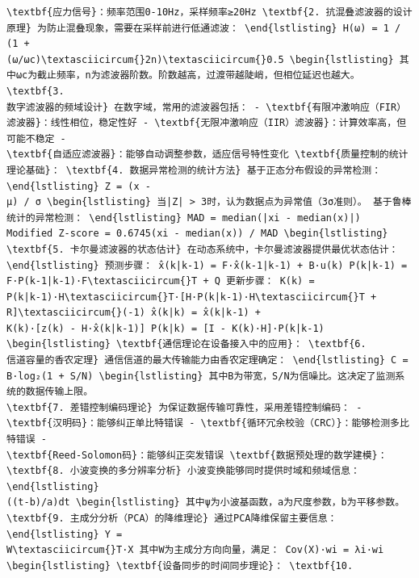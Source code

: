 \begin{verbatim}
\textbf{应力信号}：频率范围0-10Hz，采样频率≥20Hz \textbf{2. 抗混叠滤波器的设计原理} 为防止混叠现象，需要在采样前进行低通滤波： \end{lstlisting} H(ω) = 1 / (1 +
(ω/ωc)\textasciicircum{}2n)\textasciicircum{}0.5 \begin{lstlisting} 其中ωc为截止频率，n为滤波器阶数。阶数越高，过渡带越陡峭，但相位延迟也越大。 \textbf{3.
数字滤波器的频域设计} 在数字域，常用的滤波器包括： - \textbf{有限冲激响应（FIR）滤波器}：线性相位，稳定性好 - \textbf{无限冲激响应（IIR）滤波器}：计算效率高，但可能不稳定 -
\textbf{自适应滤波器}：能够自动调整参数，适应信号特性变化 \textbf{质量控制的统计理论基础}： \textbf{4. 数据异常检测的统计方法} 基于正态分布假设的异常检测： \end{lstlisting} Z = (x -
μ) / σ \begin{lstlisting} 当|Z| > 3时，认为数据点为异常值（3σ准则）。 基于鲁棒统计的异常检测： \end{lstlisting} MAD = median(|xi - median(x)|)
Modified Z-score = 0.6745(xi - median(x)) / MAD \begin{lstlisting} \textbf{5. 卡尔曼滤波器的状态估计} 在动态系统中，卡尔曼滤波器提供最优状态估计：
\end{lstlisting} 预测步骤： x̂(k|k-1) = F·x̂(k-1|k-1) + B·u(k) P(k|k-1) = F·P(k-1|k-1)·F\textasciicircum{}T + Q 更新步骤： K(k) =
P(k|k-1)·H\textasciicircum{}T·[H·P(k|k-1)·H\textasciicircum{}T + R]\textasciicircum{}(-1) x̂(k|k) = x̂(k|k-1) +
K(k)·[z(k) - H·x̂(k|k-1)] P(k|k) = [I - K(k)·H]·P(k|k-1) \begin{lstlisting} \textbf{通信理论在设备接入中的应用}： \textbf{6.
信道容量的香农定理} 通信信道的最大传输能力由香农定理确定： \end{lstlisting} C = B·log₂(1 + S/N) \begin{lstlisting} 其中B为带宽，S/N为信噪比。这决定了监测系统的数据传输上限。
\textbf{7. 差错控制编码理论} 为保证数据传输可靠性，采用差错控制编码： - \textbf{汉明码}：能够纠正单比特错误 - \textbf{循环冗余校验（CRC）}：能够检测多比特错误 -
\textbf{Reed-Solomon码}：能够纠正突发错误 \textbf{数据预处理的数学建模}： \textbf{8. 小波变换的多分辨率分析} 小波变换能够同时提供时域和频域信息： \end{lstlisting}
((t-b)/a)dt \begin{lstlisting} 其中ψ为小波基函数，a为尺度参数，b为平移参数。 \textbf{9. 主成分分析（PCA）的降维理论} 通过PCA降维保留主要信息： \end{lstlisting} Y =
W\textasciicircum{}T·X 其中W为主成分方向向量，满足： Cov(X)·wi = λi·wi \begin{lstlisting} \textbf{设备同步的时间同步理论}： \textbf{10.

\end{verbatim}
